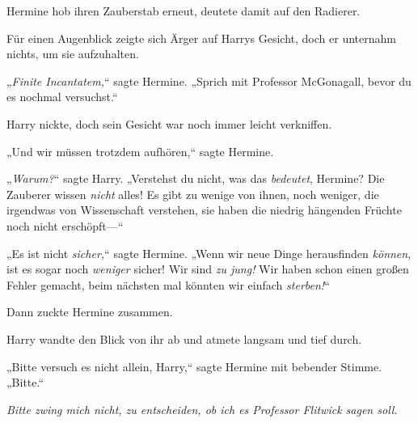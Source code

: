 Hermine hob ihren Zauberstab erneut, deutete damit auf den Radierer.

Für einen Augenblick zeigte sich Ärger auf Harrys Gesicht, doch er unternahm nichts, um sie aufzuhalten.

„\emph{Finite Incantatem,}“ sagte Hermine. „Sprich mit Professor McGonagall, bevor du es nochmal versuchst.“

Harry nickte, doch sein Gesicht war noch immer leicht verkniffen.

„Und wir müssen trotzdem aufhören,“ sagte Hermine.

„\emph{Warum?}“ sagte Harry. „Verstehst du nicht, was das \emph{bedeutet}, Hermine? Die Zauberer wissen \emph{nicht} alles! Es gibt zu wenige von ihnen, noch weniger, die irgendwas von Wissenschaft verstehen, sie haben die niedrig hängenden Früchte noch nicht erschöpft—“

„Es ist nicht \emph{sicher,}“ sagte Hermine. „Wenn wir neue Dinge herausfinden \emph{können}, ist es sogar noch \emph{weniger} sicher! Wir sind \emph{zu jung!} Wir haben schon einen großen Fehler gemacht, beim nächsten mal könnten wir einfach \emph{sterben!}“

Dann zuckte Hermine zusammen.

Harry wandte den Blick von ihr ab und atmete langsam und tief durch.

„Bitte versuch es nicht allein, Harry,“ sagte Hermine mit bebender Stimme. „Bitte.“

\emph{Bitte zwing mich nicht, zu entscheiden, ob ich es Professor Flitwick sagen soll.}

